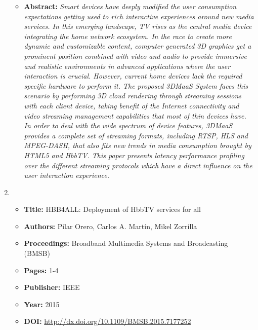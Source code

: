 \begin{enumerate}
\begin{itemize}
	\item \textbf{Abstract:} \textit{Smart devices have deeply modified the user consumption expectations getting used to rich interactive experiences around new media services. In this emerging landscape, TV rises as the central media device integrating the home network ecosystem. In the race to create more dynamic and customizable content, computer generated 3D graphics get a prominent position combined with video and audio to provide immersive and realistic environments in advanced applications where the user interaction is crucial. However, current home devices lack the required specific hardware to perform it. The proposed 3DMaaS System faces this scenario by performing 3D cloud rendering through streaming sessions with each client device, taking benefit of the Internet connectivity and video streaming management capabilities that most of thin devices have. In order to deal with the wide spectrum of device features, 3DMaaS provides a complete set of streaming formats, including RTSP, HLS and MPEG-DASH, that also fits new trends in media consumption brought by HTML5 and HbbTV. This paper presents latency performance profiling over the different streaming protocols which have a direct influence on the user interaction experience.}
\end{itemize}
\hrulefill
\item 
\begin{itemize} \itemsep1pt\parskip0pt
	\item \textbf{Title:} HBB4ALL: Deployment of HbbTV services for all
	\item \textbf{Authors:} Pilar Orero, Carlos A. Martín, Mikel Zorrilla
	\item \textbf{Proceedings:} Broadband Multimedia Systems and Broadcasting (BMSB)
	\item \textbf{Pages:} 1-4
 	\item \textbf{Publisher:} IEEE
	\item \textbf{Year:} 2015
	\item \textbf{DOI:} \url{http://dx.doi.org/10.1109/BMSB.2015.7177252}

\end{itemize}
\end{enumerate}
